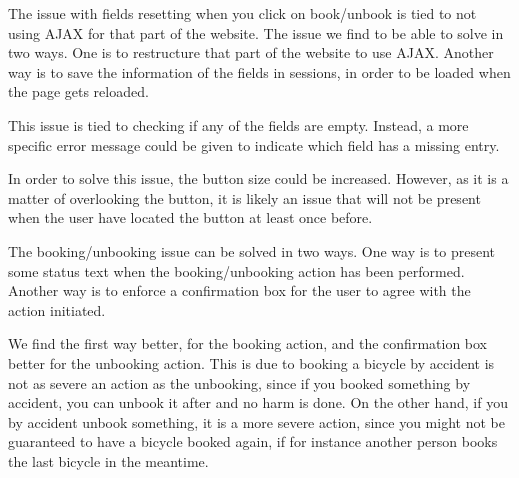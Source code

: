 \begin{description}[style=nextline]
	\item[{\#}1 Fields reset]
	The issue with fields resetting when you click on book/unbook is tied to not using AJAX for that part of the website.
	The issue we find to be able to solve in two ways.
	One is to restructure that part of the website to use AJAX.
	Another way is to save the information of the fields in sessions, in order to be loaded when the page gets reloaded. 
	\item[{\#}2 Error message understandability]
	This issue is tied to checking if any of the fields are empty.
	Instead, a more specific error message could be given to indicate which field has a missing entry.
	\item[{\#}3 Difficulty finding history]
	In order to solve this issue, the button size could be increased.
	However, as it is a matter of overlooking the button, it is likely an issue that will not be present when the user have located the button at least once before.
	\item[{\#}4 Booking/Unbooking confirmation]
	The booking/unbooking issue can be solved in two ways.
	One way is to present some status text when the booking/unbooking action has been performed.
	Another way is to enforce a confirmation box for the user to agree with the action initiated.
	
	We find the first way better, for the booking action, and the confirmation box better for the unbooking action.
	This is due to booking a bicycle by accident is not as severe an action as the unbooking, since if you booked something by accident, you can unbook it after and no harm is done.
	On the other hand, if you by accident unbook something, it is a more severe action, since you might not be guaranteed to have a bicycle booked again, if for instance another person books the last bicycle in the meantime.
\end{description}